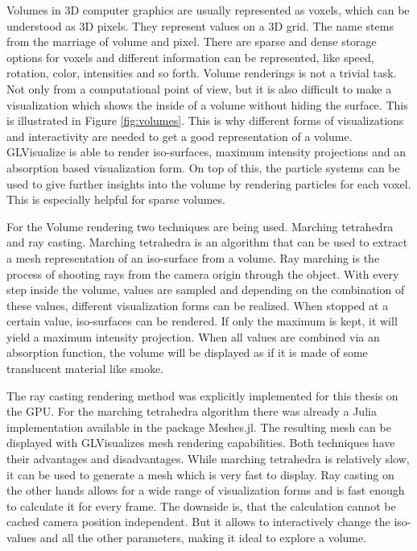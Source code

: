 Volumes in 3D computer graphics are usually represented as voxels, which can be understood as 3D pixels. 
They represent values on a 3D grid. The name stems from the marriage of volume and pixel.
There are sparse and dense storage options for voxels and different information can be represented, like speed, rotation, color, intensities and so forth.
Volume renderings is not a trivial task. 
Not only from a computational point of view, but it is also difficult to make a visualization which shows the inside of a volume without hiding the surface. This is illustrated in Figure \ref{fig:volumes}.
This is why different forms of visualizations and interactivity are needed to get a good representation of a volume.
GLVisualize is able to render iso-surfaces, maximum intensity projections and an absorption based visualization form. 
On top of this, the particle systems can be used to give further insights into the volume by rendering particles for each voxel. This is especially helpful for sparse volumes.

For the Volume rendering two techniques are being used. 
Marching tetrahedra and ray casting\cite{marques2009gpu}. 
Marching tetrahedra is an algorithm that can be used to extract a mesh representation of an iso-surface from a volume.
Ray marching is the process of shooting rays from the camera origin through the object.
With every step inside the volume, values are sampled and depending on the combination of these values, different visualization forms can be realized. 
When stopped at a certain value, iso-surfaces can be rendered. 
If only the maximum is kept, it will yield a maximum intensity projection. 
When all values are combined via an absorption function, the volume will be displayed as if it is made of some translucent material like smoke.

The ray casting rendering method was explicitly implemented for this thesis on the GPU. For the marching tetrahedra algorithm there was already a Julia implementation available in the package Meshes.jl\cite{Tedrahedra}. The resulting mesh can be displayed with GLVisualizes mesh rendering capabilities.
Both techniques have their advantages and disadvantages. 
While marching tetrahedra is relatively slow, it can be used to generate a mesh which is very fast to display. 
Ray casting on the other hands allows for a wide range of visualization forms and is fast enough to calculate it for every frame. The downside is, that the calculation cannot be cached camera position independent. But it allows to interactively change the iso-values and all the other parameters, making it ideal to explore a volume.
 

